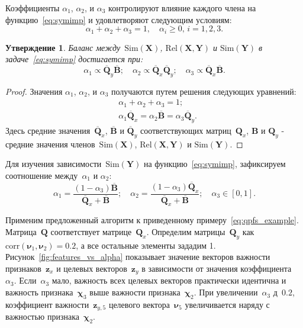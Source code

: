 \documentclass[preprint,12pt]{elsarticle}
\newtheorem{proposition}{Утверждение}
\theoremstyle{definition}
\newcommand{\bz}{\mathbf{z}}
\newcommand{\bY}{\mathbf{Y}}
\newcommand{\bX}{\mathbf{X}}
\newcommand{\bB}{\mathbf{B}}
\newcommand{\bQ}{\mathbf{Q}}
\newcommand{\bchi}{\boldsymbol{\chi}}
\newcommand{\bnu}{\boldsymbol{\nu}}
\begin{document}
Коэффициенты $\alpha_1$, $\alpha_2$, и $\alpha_3$ контролируют влияние каждого члена на функцию~\eqref{eq:symimp} и удовлетворяют следующим условиям:
\begin{equation*}
\alpha_1 + \alpha_2 + \alpha_3 = 1, \quad \alpha_i \geq 0, \, i = 1, 2, 3.
\end{equation*}
\begin{proposition}
    Баланс между~$\text{Sim}(\bX)$, $\text{Rel}(\bX, \bY)$ и $\text{Sim}(\bY)$ в  задаче~\eqref{eq:symimp} достигается при:
	\begin{equation}
	\alpha_1 \propto \overline{\bQ}_y \overline{\bB} ; \quad
	\alpha_2 \propto \overline{\bQ}_x \overline{\bQ}_y; \quad
	\alpha_3  \propto \overline{\bQ}_x \overline{\bB}.
	\label{eq:alpha_3}
	\end{equation}
	
\end{proposition}
\begin{proof}
    Значения $\alpha_1$, $\alpha_2$, и $\alpha_3$ получаются путем решения следующих уравнений:
	\begin{align*}
	&\alpha_1 + \alpha_2 + \alpha_3 = 1; \\
	&\alpha_1 \overline{\bQ}_x = \alpha_2 \overline{\bB} = \alpha_3 \overline{\bQ}_y.
	\end{align*}
	Здесь средние значения~$\overline{\bQ}_x$, $\overline{\bB}$ и $\overline{\bQ}_y$ соответствующих матриц~$\bQ_x$, $\bB$ и $\bQ_y$ - средние значения членов~$\text{Sim}(\bX)$, $\text{Rel}(\bX, \bY)$ и $\text{Sim}(\bY)$.
\end{proof}
Для изучения зависимости~$\text{Sim}(\bY)$ на функцию~\eqref{eq:symimp}, зафиксируем соотношение между~$\alpha_1$ и $\alpha_2$:
\begin{equation}
\alpha_1 = \frac{(1 - \alpha_3)\overline{\bB}}{\overline{\bQ}_x + \overline{\bB}}; \quad
\alpha_2 = \frac{(1 - \alpha_3)\overline{\bQ}_x}{\overline{\bQ}_x + \overline{\bB}}; \quad
\alpha_3 \in [0, 1].
\label{eq:alphas3}
\end{equation}

Применим предложенный алгоритм к приведенному примеру~\eqref{eq:qpfs_example}.
Матрица~$\bQ$ соответствует матрице~$\bQ_x$.
Определим матрицы~$\bQ_y$ как $\text{corr}(\bnu_1, \bnu_2) = 0.2$, а все остальные элементы зададим 1.
Рисунок~\ref{fig:features_vs_alpha} показывает значение векторов важности признаков~$\bz_x$ и целевых векторов~$\bz_y$ в зависимости от значения коэффициента~$\alpha_3$.
Если~$\alpha_3$ мало, важность всех целевых векторов практически идентична и важность признака~$\bchi_3$ выше важности признака~$\bchi_2$. При увеличении~$\alpha_3$ д~$0.2$, коэффициент важности~$\bz_{y,5}$ целевого вектора~$\bnu_5$ увеличивается наряду с важностью признака~$\bchi_2$.
\end{document}
